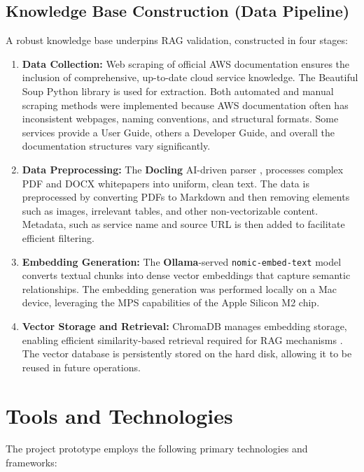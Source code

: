 \subsection{Knowledge Base Construction (Data Pipeline)}

A robust knowledge base underpins RAG validation, constructed in four stages:

\begin{enumerate}
    \item \textbf{Data Collection:} Web scraping of official AWS documentation ensures the inclusion of comprehensive, up-to-date cloud service knowledge. The Beautiful Soup Python library is used for extraction. Both automated and manual scraping methods were implemented because AWS documentation often has inconsistent webpages, naming conventions, and structural formats. Some services provide a User Guide, others a Developer Guide, and overall the documentation structures vary significantly.
    \item \textbf{Data Preprocessing:} The \textbf{Docling} AI-driven parser \cite{docling2025paper}, \cite{docling2024web} processes complex PDF and DOCX whitepapers into uniform, clean text. The data is preprocessed by converting PDFs to Markdown and then removing elements such as images, irrelevant tables, and other non-vectorizable content. Metadata, such as service name and source URL is then added to facilitate efficient filtering.
    \item \textbf{Embedding Generation:} The \textbf{Ollama}-served \texttt{nomic-embed-text} model converts textual chunks into dense vector embeddings that capture semantic relationships. The embedding generation was performed locally on a Mac device, leveraging the MPS capabilities of the Apple Silicon M2 chip.
    \item \textbf{Vector Storage and Retrieval:} ChromaDB manages embedding storage, enabling efficient similarity-based retrieval required for RAG mechanisms \cite{chromadb2024}. The vector database is persistently stored on the hard disk, allowing it to be reused in future operations.
\end{enumerate}

\section{Tools and Technologies}

The project prototype employs the following primary technologies and frameworks:

